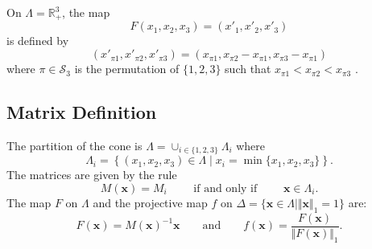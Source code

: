 On $\Lambda=\mathbb{R}^3_+$, the map
\[
F (x_1,x_2,x_3) = (x'_1,x'_2,x'_3)
\]
is defined by
\[
    (x'_{\pi 1}, x'_{\pi 2}, x'_{\pi 3}) =
    (x_{\pi 1}, x_{\pi 2}-x_{\pi 1}, x_{\pi 3}-x_{\pi 1})
\]
where $\pi\in\mathcal{S}_3$ is the permutation of $\{1,2,3\}$ such that
$x_{\pi 1}<x_{\pi 2}<x_{\pi 3}$
\cite{schweiger}.
\subsection{Matrix Definition}
The partition of the cone is
$\Lambda=\cup_{i\in\{1,2,3\}}\Lambda_i$ where
\[
    \Lambda_i = \left\{(x_1,x_2,x_3)\in\Lambda\mid 
    x_i = \min\{x_1,x_2,x_3\}\right\}.
\]
The matrices are given by the rule
\[
    M(\mathbf{x}) = M_i
    \qquad\text{ if and only if }\qquad
    \mathbf{x}\in\Lambda_i.
\]
The map $F$ on $\Lambda$ and
the projective map $f$ on
$\Delta=\{\mathbf{x}\in\Lambda\mid\Vert\mathbf{x}\Vert_1=1\}$ are:
\[
    F(\mathbf{x}) = M(\mathbf{x})^{-1}\mathbf{x}
    \qquad\text{and}\qquad
    f(\mathbf{x}) = \frac{F(\mathbf{x})}{\Vert F(\mathbf{x})\Vert_1}.
\]
